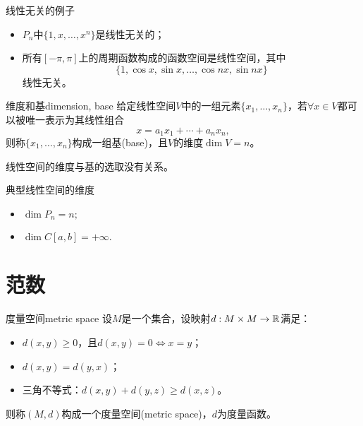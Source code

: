 \begin{example}
    {线性无关的例子}{}
    \begin{itemize}
        \item $P_n$中$\{1,x,\ldots,x^n\}$是线性无关的；
        \item 所有$[-\pi,\pi]$上的周期函数构成的函数空间是线性空间，其中
        \[
            \{1,\cos x,\sin x,\ldots,\cos nx,\sin nx\} 
        \]
        线性无关。
    \end{itemize}
\end{example}

\begin{definition}
    {维度和基}{dimension, base}
    给定线性空间$V$中的一组元素$\{x_1,\ldots,x_n\}$，若$\forall x\in V$都可以被唯一表示为其线性组合
    \begin{equation}
        x=a_1x_1+\cdots+a_nx_n,
    \end{equation}
    则称$\{x_1,\ldots,x_n\}$构成一组基(base)，且$V$的维度$\dim V=n$。
\end{definition}

\begin{theorem}
    {}{}
    线性空间的维度与基的选取没有关系。
\end{theorem}

\begin{example}
    {典型线性空间的维度}{}
    \begin{itemize}
        \item $\dim P_n=n;$
        \item $\dim C[a,b]=+\infty.$
    \end{itemize}
\end{example}

\section{范数}
\label{sec:norm}

\begin{definition}
    {度量空间}{metric space}
    设$M$是一个集合，设映射$d:M\times M\to\mathbb R$满足：
    \begin{itemize}
        \item $d(x,y)\geq 0$，且$d(x,y)=0\iff x=y$；
        \item $d(x,y)=d(y,x)$；
        \item 三角不等式：$d(x,y)+d(y,z)\geq d(x,z)$。
    \end{itemize}
    则称$(M,d)$构成一个度量空间(metric space)，$d$为度量函数。
\end{definition}

